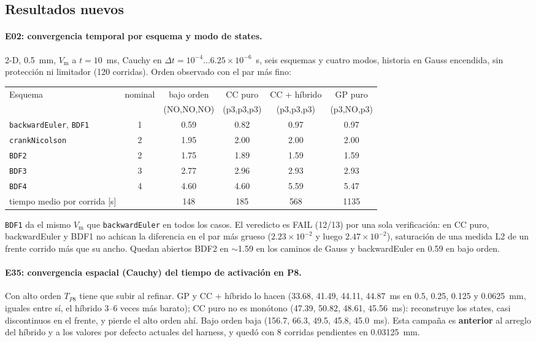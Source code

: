 \documentclass[11pt,a4paper]{article}
\newcommand{\code}[1]{\texttt{\small #1}}
\newcommand{\Vm}{V_{\text{m}}}
\begin{document}
\subsection{Resultados nuevos}
\label{sec:oct-results}

\paragraph{E02: convergencia temporal por esquema y modo de states.} 2-D,
0.5~mm, $\Vm$ a $t=10$~ms, Cauchy en $\Delta t=10^{-4}\dots6.25\times10^{-6}$~s,
seis esquemas y cuatro modos, historia en Gauss encendida, sin protección ni
limitador (120 corridas). Orden observado con el par más fino:

\begin{center}
\begin{tabular}{@{}lccccc@{}}
\toprule
Esquema & nominal & bajo orden & CC puro & CC + híbrido & GP puro \\
        &         & (NO,NO,NO) & (p3,p3,p3) & (p3,p3,p3) & (p3,NO,p3) \\
\midrule
\code{backwardEuler}, \code{BDF1} & 1 & 0.59 & 0.82 & 0.97 & 0.97 \\
\code{crankNicolson} & 2 & 1.95 & 2.00 & 2.00 & 2.00 \\
\code{BDF2} & 2 & 1.75 & 1.89 & 1.59 & 1.59 \\
\code{BDF3} & 3 & 2.77 & 2.96 & 2.93 & 2.93 \\
\code{BDF4} & 4 & 4.60 & 4.60 & 5.59 & 5.47 \\
\midrule
tiempo medio por corrida [s] & & 148 & 185 & 568 & 1135 \\
\bottomrule
\end{tabular}
\end{center}

\code{BDF1} da el mismo $\Vm$ que \code{backwardEuler} en todos los casos. El
veredicto es FAIL (12/13) por una sola verificación: en CC puro, backwardEuler y
BDF1 no achican la diferencia en el par más grueso ($2.23\times10^{-2}$ y luego
$2.47\times10^{-2}$), saturación de una medida L2 de un frente corrido más que su
ancho. Quedan abiertos BDF2 en $\sim$1.59 en los caminos de Gauss y
backwardEuler en 0.59 en bajo orden.

\paragraph{E35: convergencia espacial (Cauchy) del tiempo de activación en P8.}
Con alto orden $T_{P8}$ tiene que subir al refinar. GP y CC + híbrido lo hacen
(33.68, 41.49, 44.11, 44.87~ms en 0.5, 0.25, 0.125 y 0.0625~mm, iguales entre sí,
el híbrido 3--6 veces más barato); CC puro no es monótono (47.39, 50.82, 48.61,
45.56~ms): reconstruye los states, casi discontinuos en el frente, y pierde el
alto orden ahí. Bajo orden baja (156.7, 66.3, 49.5, 45.8, 45.0~ms). Esta campaña es
\textbf{anterior} al arreglo del híbrido y a los valores por defecto actuales del
harness, y quedó con 8 corridas pendientes en 0.03125~mm.
\end{document}
